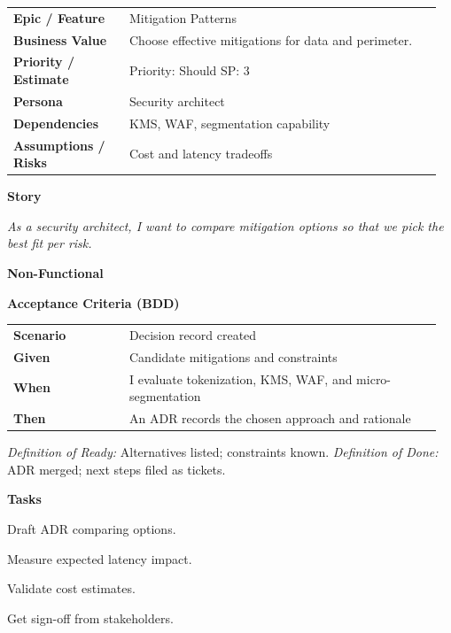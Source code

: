 \documentclass[11pt,letterpaper]{article}
\makeatletter
\newenvironment{kvtable}{%
  \par\noindent\begin{tabular}{@{}>{\raggedright\bfseries\arraybackslash}p{0.26\linewidth} >{\raggedright\arraybackslash}p{0.70\linewidth}@{}}
}{\end{tabular}\par}
\newenvironment{bdd}{%
  \par\noindent\begin{tabular}{@{}>{\raggedright\bfseries\arraybackslash}p{0.26\linewidth} >{\raggedright\arraybackslash}p{0.70\linewidth}@{}}
}{\end{tabular}\par}
\newcommand{\DoRDoD}[2]{%
  \vspace{0.35em}
  {\footnotesize\color{Muted}%
    \textit{Definition of Ready:} #1 \; \textbullet\;
    \textit{Definition of Done:} #2%
  }%
}
\newenvironment{storycard}[2]{%
  \begin{tcolorbox}[cloudcard, title={#1 --- #2}]%
}{\end{tcolorbox}}
\newcommand{\sectionlabel}[1]{\par\vspace{0.35em}\textbf{#1}\par}
\makeatother
\begin{document}
\begin{storycard}{CCS-9}{Ch. 9 — Risk Mitigation Methods}
\begin{kvtable}
Epic / Feature & Mitigation Patterns\\
Business Value & Choose effective mitigations for data and perimeter.\\
Priority / Estimate & Priority: Should \quad SP: 3\\
Persona & Security architect\\
Dependencies & KMS, WAF, segmentation capability\\
Assumptions / Risks & Cost and latency tradeoffs\\
\end{kvtable}
\sectionlabel{Story}
\textit{As a security architect, I want to compare mitigation options so that we pick the best fit per risk.}
\sectionlabel{Non-Functional}\;
\sectionlabel{Acceptance Criteria (BDD)}
\begin{bdd}
Scenario & Decision record created\\
Given & Candidate mitigations and constraints\\
When & I evaluate tokenization, KMS, WAF, and micro-segmentation\\
Then & An ADR records the chosen approach and rationale\\
\end{bdd}
\DoRDoD{Alternatives listed; constraints known.}{ADR merged; next steps filed as tickets.}
\sectionlabel{Tasks}
\begin{checklist}
\item Draft ADR comparing options.
\item Measure expected latency impact.
\item Validate cost estimates.
\item Get sign-off from stakeholders.
\end{checklist}
\end{storycard}
\end{document}
